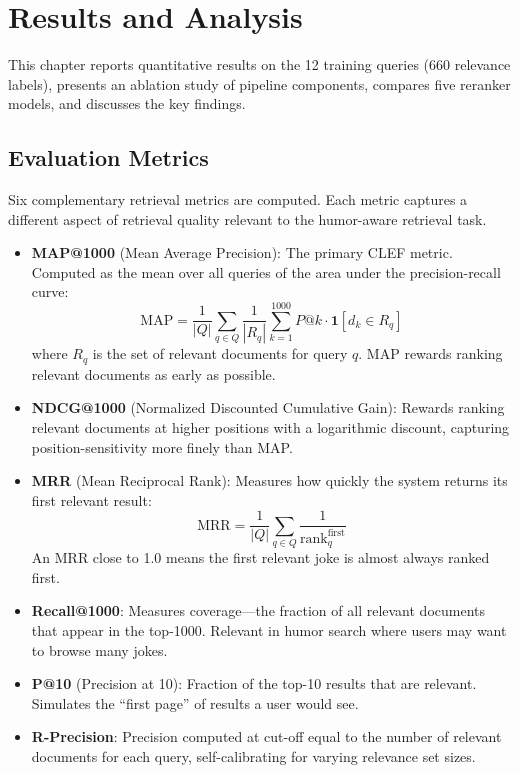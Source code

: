 \chapter{Results and Analysis}
\justify

This chapter reports quantitative results on the 12 training queries (660 relevance labels), presents an ablation study of pipeline components, compares five reranker models, and discusses the key findings.

\section{Evaluation Metrics}

Six complementary retrieval metrics are computed. Each metric captures a different aspect of retrieval quality relevant to the humor-aware retrieval task.

\begin{itemize}
    \item \textbf{MAP@1000} (Mean Average Precision): The primary CLEF metric. Computed as the mean over all queries of the area under the precision-recall curve:
    \begin{equation}
        \text{MAP} = \frac{1}{|Q|} \sum_{q \in Q} \frac{1}{|R_q|} \sum_{k=1}^{1000} P@k \cdot \mathbf{1}[d_k \in R_q]
    \end{equation}
    where $R_q$ is the set of relevant documents for query $q$. MAP rewards ranking relevant documents as early as possible.

    \item \textbf{NDCG@1000} (Normalized Discounted Cumulative Gain): Rewards ranking relevant documents at higher positions with a logarithmic discount, capturing position-sensitivity more finely than MAP.

    \item \textbf{MRR} (Mean Reciprocal Rank): Measures how quickly the system returns its first relevant result:
    \begin{equation}
        \text{MRR} = \frac{1}{|Q|} \sum_{q \in Q} \frac{1}{\text{rank}_q^{\text{first}}}
    \end{equation}
    An MRR close to 1.0 means the first relevant joke is almost always ranked first.

    \item \textbf{Recall@1000}: Measures coverage---the fraction of all relevant documents that appear in the top-1000. Relevant in humor search where users may want to browse many jokes.

    \item \textbf{P@10} (Precision at 10): Fraction of the top-10 results that are relevant. Simulates the ``first page'' of results a user would see.

    \item \textbf{R-Precision}: Precision computed at cut-off equal to the number of relevant documents for each query, self-calibrating for varying relevance set sizes.
\end{itemize}

